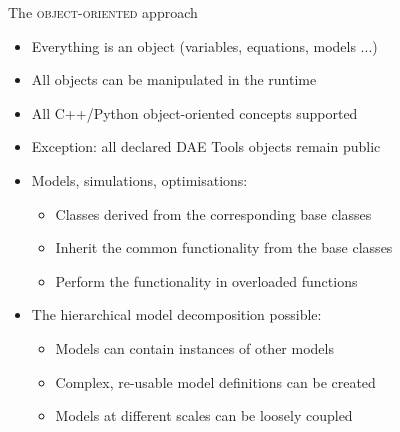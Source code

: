 \documentclass[compress,newPxFont,sthlmFooter]{beamer}
\begin{document}
\begin{frame}{The \textsc{object-oriented} approach}
\begin{itemize}
  \item Everything is an \alert{object} (variables, equations, models ...)
  \item All objects can be \alert{manipulated} in \alert{the runtime}
  \item \alert{All} C++/Python \alert{object-oriented concepts supported}
  \item \alert{Exception}: all declared DAE Tools objects \alert{remain public}
  \item Models, simulations, optimisations:
     \begin{itemize}
        \item Classes \alert{derived from} the corresponding \alert{base classes}
        \item \alert{Inherit} the \alert{common functionality} from the base classes
        \item Perform the \alert{functionality} in \alert{overloaded functions}
     \end{itemize}
  \item The \alert{hierarchical model decomposition} possible:
    \begin{itemize}
        \item Models can contain instances of other models
        \item Complex, re-usable model definitions can be created
        \item Models at different scales can be loosely coupled %
    \end{itemize}
\end{itemize}
\end{frame}
\end{document}
